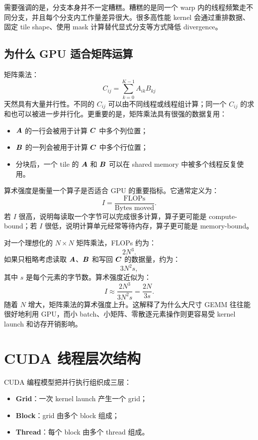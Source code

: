 需要强调的是，分支本身并不一定糟糕。糟糕的是同一个 warp 内的线程频繁走不同分支，并且每个分支内工作量差异很大。很多高性能 kernel 会通过重排数据、固定 tile shape、使用 mask 计算替代显式分支等方式降低 divergence。

\subsection{为什么 GPU 适合矩阵运算}
\label{subsec:why-gpu-good-at-matmul}

矩阵乘法：
\[
  C_{ij}=\sum_{k=0}^{K-1}A_{ik}B_{kj}
\]
天然具有大量并行性。不同的 $C_{ij}$ 可以由不同线程或线程组计算；同一个 $C_{ij}$ 的求和也可以被进一步并行化。更重要的是，矩阵乘法具有很强的数据复用：

\begin{itemize}
  \item $\bm{A}$ 的一行会被用于计算 $\bm{C}$ 中多个列位置；
  \item $\bm{B}$ 的一列会被用于计算 $\bm{C}$ 中多个行位置；
  \item 分块后，一个 tile 的 $\bm{A}$ 和 $\bm{B}$ 可以在 shared memory 中被多个线程反复使用。
\end{itemize}

算术强度是衡量一个算子是否适合 GPU 的重要指标。它通常定义为：
\[
  I=\frac{\text{FLOPs}}{\text{Bytes moved}}.
\]
若 $I$ 很高，说明每读取一个字节可以完成很多计算，算子更可能是 compute-bound；若 $I$ 很低，说明计算单元经常等待内存，算子更可能是 memory-bound。

对一个理想化的 $N\times N$ 矩阵乘法，FLOPs 约为：
\[
  2N^3.
\]
如果只粗略考虑读取 $\bm{A}$、$\bm{B}$ 和写回 $\bm{C}$ 的数据量，约为：
\[
  3N^2s,
\]
其中 $s$ 是每个元素的字节数。算术强度近似为：
\[
  I\approx \frac{2N^3}{3N^2s}=\frac{2N}{3s}.
\]
随着 $N$ 增大，矩阵乘法的算术强度上升。这解释了为什么大尺寸 GEMM 往往能很好地利用 GPU，而小 batch、小矩阵、零散逐元素操作则更容易受 kernel launch 和访存开销影响。

\section{CUDA 线程层次结构}
\label{sec:cuda-thread-hierarchy}

CUDA 编程模型把并行执行组织成三层：

\begin{itemize}
  \item \textbf{Grid}：一次 kernel launch 产生一个 grid；
  \item \textbf{Block}：grid 由多个 block 组成；
  \item \textbf{Thread}：每个 block 由多个 thread 组成。
\end{itemize}

